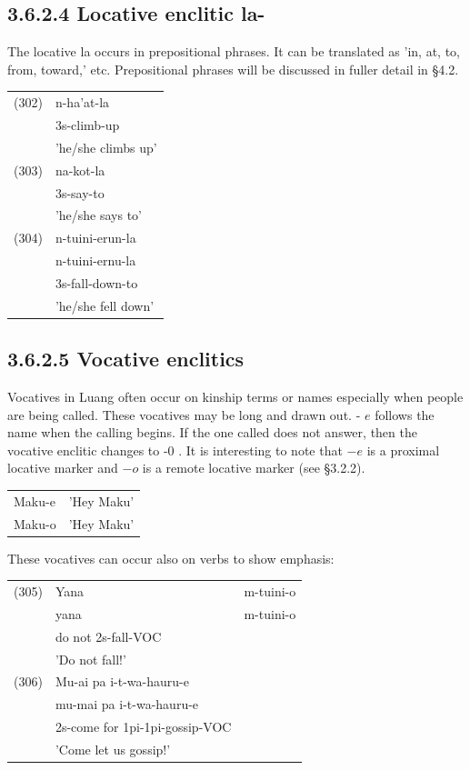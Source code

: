 \documentclass[10pt]{article}
\begin{document}
\subsection*{3.6.2.4 Locative enclitic la-}
The locative la occurs in prepositional phrases. It can be translated as 'in, at, to, from, toward,' etc. Prepositional phrases will be discussed in fuller detail in §4.2.

\begin{center}
\begin{tabular}{ll}
(302) & n-ha'at-la \\
 & 3s-climb-up \\
 & 'he/she climbs up' \\
(303) & na-kot-la \\
 & 3s-say-to \\
 & 'he/she says to' \\
(304) & n-tuini-erun-la \\
 & n-tuini-ernu-la \\
 & 3s-fall-down-to \\
 & 'he/she fell down' \\
\end{tabular}
\end{center}

\subsection*{3.6.2.5 Vocative enclitics}
Vocatives in Luang often occur on kinship terms or names especially when people are being called. These vocatives may be long and drawn out. - \(e\) follows the name when the calling begins. If the one called does not answer, then the vocative enclitic changes to -0 . It is interesting to note that \(-e\) is a proximal locative marker and \(-o\) is a remote locative marker (see §3.2.2).

\begin{center}
\begin{tabular}{ll}
Maku-e & 'Hey Maku' \\
Maku-o & 'Hey Maku' \\
\end{tabular}
\end{center}

These vocatives can occur also on verbs to show emphasis:

\begin{center}
\begin{tabular}{lll}
(305) & Yana & m-tuini-o \\
 & yana & m-tuini-o \\
 & do not 2s-fall-VOC &  \\
 & 'Do not fall!' &  \\
(306) & Mu-ai pa i-t-wa-hauru-e &  \\
 & mu-mai pa i-t-wa-hauru-e &  \\
 & 2s-come for 1pi-1pi-gossip-VOC &  \\
 & 'Come let us gossip!' &  \\
\end{tabular}
\end{center}
\end{document}
